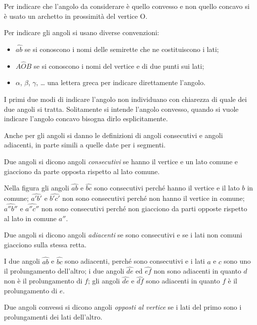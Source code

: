 Per indicare che l'angolo da considerare è quello convesso e non quello concavo si è usato un archetto in prossimità del vertice O.

Per indicare gli angoli si usano diverse convenzioni:
\begin{itemize}
\item  $\widehat{ab}$ se si conoscono i nomi delle semirette che ne costituiscono i lati;
\item  $A\widehat {{O}}B$ se si conoscono i nomi del vertice e di due punti sui lati;
\item  $\alpha$, $\beta$, $\gamma$, \ldots{} una lettera greca per indicare direttamente l'angolo.
\end{itemize}
I primi due modi di indicare l'angolo non individuano con chiarezza di quale dei due angoli si tratta. Solitamente si intende l'angolo convesso, quando si vuole indicare l'angolo concavo bisogna dirlo esplicitamente.

Anche per gli angoli si danno le definizioni di angoli consecutivi e angoli adiacenti, in parte simili a quelle date per i segmenti.

\begin{definizione}
Due angoli si dicono angoli \emph{consecutivi} se hanno il vertice e un lato comune e giacciono da parte opposta rispetto al lato comune.
\end{definizione}

Nella figura gli angoli  $\widehat {ab}$ e $\widehat {bc}$  sono consecutivi perché hanno il vertice e il lato $ b $ in comune;  $\widehat {a'b'}$ e $\widehat {b'c'}$  non sono consecutivi perché non hanno il vertice in comune;  $\widehat {a''b''}$ e $\widehat {a''c''}$ non sono consecutivi perché non giacciono da parti opposte rispetto al lato in comune $ a'' $.

\begin{definizione}
Due angoli si dicono angoli \emph{adiacenti} se sono consecutivi e se i lati non comuni giacciono sulla stessa retta.
\end{definizione}

I due angoli  $\widehat {ab}$  e  $\widehat {bc}$  sono adiacenti, perché sono consecutivi e i lati $ a $ e $ c $ sono uno il prolungamento dell'altro; i due angoli  $\widehat {de}$  ed  $\widehat {ef}$  non sono adiacenti in quanto $ d $ non è il prolungamento di $ f $; gli angoli  $\widehat {de}$  e  $\widehat {df}$ sono adiacenti in quanto $ f $ è il prolungamento di $ e $.

\begin{definizione}
Due angoli convessi si dicono angoli \emph{opposti al vertice} se i lati del primo sono i prolungamenti dei lati dell'altro.
\end{definizione}

